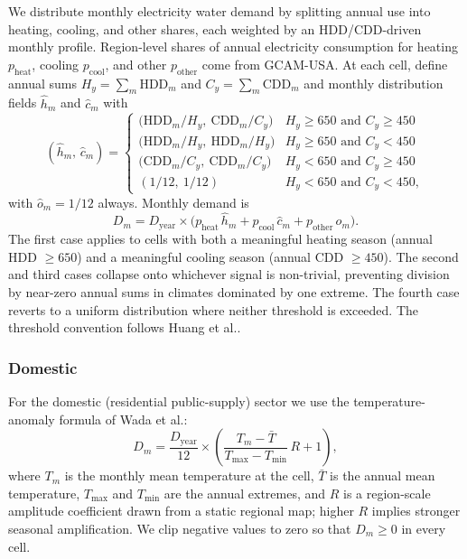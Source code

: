 \documentclass[fleqn,10pt]{wlscirep}
\begin{document}
We distribute monthly electricity water demand by splitting annual use into heating, cooling, and other shares, each weighted by an HDD/CDD-driven monthly profile. Region-level shares of annual electricity consumption for heating $p_{\mathrm{heat}}$, cooling $p_{\mathrm{cool}}$, and other $p_{\mathrm{other}}$ come from GCAM-USA. At each cell, define annual sums $H_y = \sum_m \text{HDD}_m$ and $C_y = \sum_m \text{CDD}_m$ and monthly distribution fields $\hat{h}_m$ and $\hat{c}_m$ with
\begin{equation}
(\hat{h}_m,\,\hat{c}_m) =
\begin{cases}
\big(\text{HDD}_m / H_y,\ \text{CDD}_m / C_y\big)      & H_y \ge 650 \text{ and } C_y \ge 450 \\[2pt]
\big(\text{HDD}_m / H_y,\ \text{HDD}_m / H_y\big)      & H_y \ge 650 \text{ and } C_y < 450 \\[2pt]
\big(\text{CDD}_m / C_y,\ \text{CDD}_m / C_y\big)      & H_y < 650 \text{ and } C_y \ge 450 \\[2pt]
(1/12,\ 1/12)                                          & H_y < 650 \text{ and } C_y < 450,
\end{cases}
\label{eq:elec-cases}
\end{equation}
with $\hat{o}_m = 1/12$ always. Monthly demand is
\begin{equation}
D_m = D_{\mathrm{year}} \times \big(p_{\mathrm{heat}}\,\hat{h}_m + p_{\mathrm{cool}}\,\hat{c}_m + p_{\mathrm{other}}\,\hat{o}_m\big).
\label{eq:elec-demand}
\end{equation}
The first case applies to cells with both a meaningful heating season (annual HDD $\ge 650$) and a meaningful cooling season (annual CDD $\ge 450$). The second and third cases collapse onto whichever signal is non-trivial, preventing division by near-zero annual sums in climates dominated by one extreme. The fourth case reverts to a uniform distribution where neither threshold is exceeded. The threshold convention follows Huang et al.\cite{Huang2018}.

\subsubsection*{Domestic}

For the domestic (residential public-supply) sector we use the temperature-anomaly formula of Wada et al.\cite{Wada2011}:
\begin{equation}
D_m = \frac{D_{\mathrm{year}}}{12} \times \left(\frac{T_m - \bar{T}}{T_{\max} - T_{\min}}\,R + 1\right),
\label{eq:dom-monthly}
\end{equation}
where $T_m$ is the monthly mean temperature at the cell, $\bar{T}$ is the annual mean temperature, $T_{\max}$ and $T_{\min}$ are the annual extremes, and $R$ is a region-scale amplitude coefficient drawn from a static regional map; higher $R$ implies stronger seasonal amplification. We clip negative values to zero so that $D_m \ge 0$ in every cell.
\end{document}
